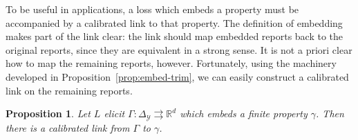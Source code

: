 \documentclass[12pt]{article}
\newcommand{\reals}{\mathbb{R}}
\newcommand{\simplex}{\Delta_\Y}
\newcommand{\Y}{\mathcal{Y}}
\newcommand{\toto}{\rightrightarrows}
\newtheorem{proposition}{Proposition}
\begin{document}
To be useful in applications, a loss which embeds a property must be accompanied by a calibrated link to that property.
The definition of embedding makes part of the link clear: the link should map embedded reports back to the original reports, since they are equivalent in a strong sense.
It is not a priori clear how to map the remaining reports, however.
Fortunately, using the machinery developed in Proposition~\ref{prop:embed-trim}, we can easily construct a calibrated link on the remaining reports.

\begin{proposition}\label{prop:embed-link}
  Let $L$ elicit $\Gamma:\simplex\toto\reals^d$ which embeds a finite property $\gamma$.
  Then there is a calibrated link from $\Gamma$ to $\gamma$. %
\end{proposition}
\end{document}
